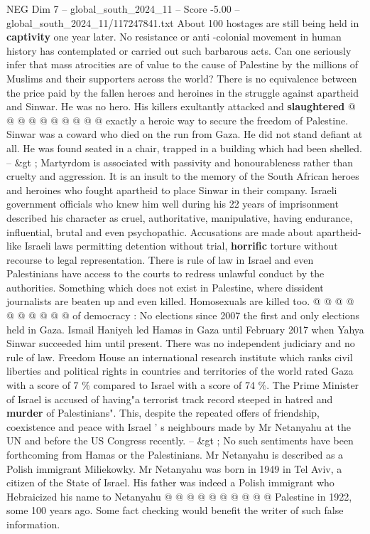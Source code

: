 \begin{textsample}{NEG Dim 7 – global\_south\_2024\_11 – Score -5.00 – global\_south\_2024\_11/117247841.txt}
About 100 hostages are still being held in \textbf{captivity} one year later.
No resistance or anti -colonial movement in human history has contemplated or carried out such barbarous acts.
Can one seriously infer that mass atrocities are of value to the cause of Palestine by the millions of Muslims and their supporters across the world?
There is no equivalence between the price paid by the fallen heroes and heroines in the struggle against apartheid and Sinwar.
He was no hero.
His killers exultantly attacked and \textbf{slaughtered} @ @ @ @ @ @ @ @ @ @ exactly a heroic way to secure the freedom of Palestine.
Sinwar was a coward who died on the run from Gaza.
He did not stand defiant at all.
He was found seated in a chair, trapped in a building which had been shelled. -- \&gt ; Martyrdom is associated with passivity and honourableness rather than cruelty and aggression.
It is an insult to the memory of the South African heroes and heroines who fought apartheid to place Sinwar in their company.
Israeli government officials who knew him well during his 22 years of imprisonment described his character as cruel, authoritative, manipulative, having endurance, influential, brutal and even psychopathic.
Accusations are made about apartheid-like Israeli laws permitting detention without trial, \textbf{horrific} torture without recourse to legal representation.
There is rule of law in Israel and even Palestinians have access to the courts to redress unlawful conduct by the authorities.
Something which does not exist in Palestine, where dissident journalists are beaten up and even killed.
Homosexuals are killed too. @ @ @ @ @ @ @ @ @ @ of democracy : No elections since 2007 the first and only elections held in Gaza.
Ismail Haniyeh led Hamas in Gaza until February 2017 when Yahya Sinwar succeeded him until present.
There was no independent judiciary and no rule of law.
Freedom House an international research institute which ranks civil liberties and political rights in countries and territories of the world rated Gaza with a score of 7 \% compared to Israel with a score of 74 \%.
The Prime Minister of Israel is accused of having"a terrorist track record steeped in hatred and \textbf{murder} of Palestinians".
This, despite the repeated offers of friendship, coexistence and peace with Israel ' s neighbours made by Mr Netanyahu at the UN and before the US Congress recently. -- \&gt ; No such sentiments have been forthcoming from Hamas or the Palestinians.
Mr Netanyahu is described as a Polish immigrant Miliekowky.
Mr Netanyahu was born in 1949 in Tel Aviv, a citizen of the State of Israel.
His father was indeed a Polish immigrant who Hebraicized his name to Netanyahu @ @ @ @ @ @ @ @ @ @ Palestine in 1922, some 100 years ago.
Some fact checking would benefit the writer of such false information.

\end{textsample}

